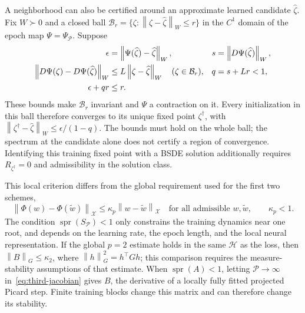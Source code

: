 \documentclass[11pt]{article}
\newcommand{\HH}{\mathcal H}
\newcommand{\PP}{\mathcal P}
\newcommand{\spr}{\operatorname{spr}}
\newcommand{\norm}[1]{\left\lVert #1\right\rVert}
\begin{document}
A neighborhood can also be certified around an approximate learned
candidate $\widehat\zeta$. Fix $W\succ0$ and a closed ball
$\mathcal B_r=\{\zeta:\norm{\zeta-\widehat\zeta}_W\leq r\}$ in the
$C^1$ domain of the epoch map $\Psi=\Psi_\PP$. Suppose
\begin{align}
 \epsilon&=\norm{\Psi(\widehat\zeta)-\widehat\zeta}_W,
 &s&=\norm{D\Psi(\widehat\zeta)}_W,\notag\\
 \norm{D\Psi(\zeta)-D\Psi(\widehat\zeta)}_W
      &\leq L\norm{\zeta-\widehat\zeta}_W\quad(\zeta\in\mathcal B_r),
 &q&=s+Lr<1,\notag\\
 \epsilon+qr&\leq r.                                    \label{eq:third-ball}
\end{align}
These bounds make $\mathcal B_r$ invariant and $\Psi$ a contraction on
it. Every initialization in this ball therefore converges to its unique
fixed point $\zeta^\dagger$, with
$\norm{\zeta^\dagger-\widehat\zeta}_W\leq\epsilon/(1-q)$.
The bounds must hold on the whole ball; the spectrum at the candidate
alone does not certify a region of convergence. Identifying this training
fixed point with a BSDE solution additionally requires $R_{\zeta^\dagger}=0$
and admissibility in the solution class.

This local criterion differs from the global requirement used for the
first two schemes,
\begin{equation}
 \norm{\Phi(w)-\Phi(\widetilde w)}_{\mathcal X}
       \leq\kappa_p\norm{w-\widetilde w}_{\mathcal X}
       \quad\text{for all admissible }w,\widetilde w,
 \qquad \kappa_p<1.                                    \label{eq:third-global}
\end{equation}
The condition $\spr(S_\PP)<1$ only constrains the training dynamics near
one root, and depends on the learning rate, the epoch length, and the
local neural representation. If the global $p=2$ estimate holds in the
same $\HH$ as the loss, then
$\norm{B}_G\leq\kappa_2$, where
$\norm{h}_G^2=h^\top Gh$; this comparison requires the measure-stability
assumptions of that estimate. When $\spr(A)<1$, letting $\PP\to\infty$
in~\eqref{eq:third-jacobian} gives $B$, the derivative of a locally fully
fitted projected Picard step. Finite training blocks change this matrix
and can therefore change its stability.
\end{document}
